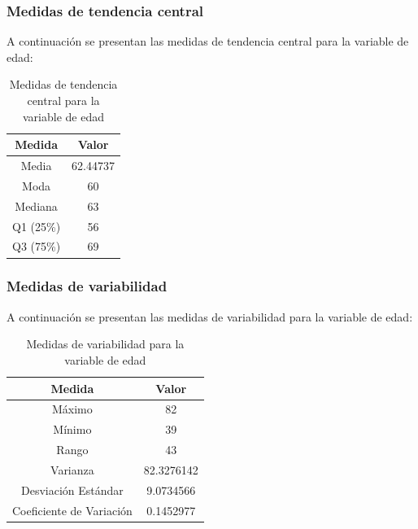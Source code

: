 \documentclass[a4paper,12pt]{article}
\begin{document}
    \subsubsection*{Medidas de tendencia central}

    A continuación se presentan las medidas de tendencia central para la variable de edad:
    
    \begin{table}[h!]
        \centering
        \begin{tabular}{|c|c|}
            \hline
            \textbf{Medida} & \textbf{Valor} \\
            \hline
            Media & 62.44737 \\
            \hline
            Moda & 60 \\
            \hline
            Mediana & 63 \\
            \hline
            Q1 (25\%) & 56 \\
            \hline
            Q3 (75\%) & 69 \\
            \hline
        \end{tabular}
        \caption{Medidas de tendencia central para la variable de edad}
        \label{tab:medidas_tendencia_central_edad}
    \end{table}
    
    \newpage
    \subsubsection*{Medidas de variabilidad}
    
    A continuación se presentan las medidas de variabilidad para la variable de edad:
    
    \begin{table}[h!]
        \centering
        \begin{tabular}{|c|c|}
            \hline
            \textbf{Medida} & \textbf{Valor} \\
            \hline
            Máximo & 82 \\
            \hline
            Mínimo & 39 \\
            \hline
            Rango & 43 \\
            \hline
            Varianza & 82.3276142 \\
            \hline
            Desviación Estándar & 9.0734566 \\
            \hline
            Coeficiente de Variación & 0.1452977 \\
            \hline
        \end{tabular}
        \caption{Medidas de variabilidad para la variable de edad}
        \label{tab:medidas_variabilidad_edad}
    \end{table}
\end{document}
